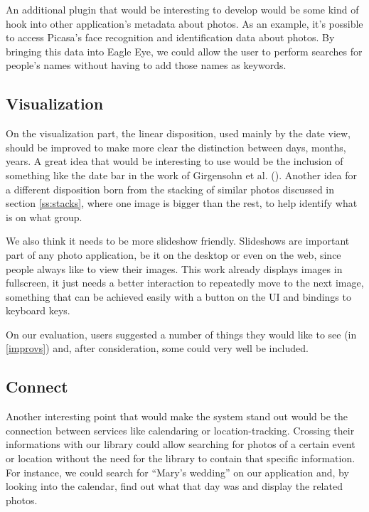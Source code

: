 An additional plugin that would be interesting to develop would be some kind of hook into other application's metadata about photos. As an example, it's possible to access Picasa's face recognition and identification data about photos. By bringing this data into Eagle Eye, we could allow the user to perform searches for people's names without having to add those names as keywords.



\subsection{Visualization} %
\label{sec:visualization}

On the visualization part, the linear disposition, used mainly by the date view, should be improved to make more clear the distinction between days, months, years. A great idea that would be interesting to use would be the inclusion of something like the date bar in the work of Girgensohn et al. \cite{Girgensohn:2010} (). Another idea for a different disposition born from the stacking of similar photos discussed in section \ref{ss:stacks}, where one image is bigger than the rest, to help identify what is on what group.

We also think it needs to be more slideshow friendly. Slideshows are important part of any photo application, be it on the desktop or even on the web, since people always like to view their images. This work already displays images in fullscreen, it just needs a better interaction to repeatedly move to the next image, something that can be achieved easily with a button on the \ac{UI} and bindings to keyboard keys.

On our evaluation, users suggested a number of things they would like to see (in \ref{improvs}) and, after consideration, some could very well be included. 


\subsection{Connect} %
\label{ssub:connect}

Another interesting point that would make the system stand out would be the connection between services like calendaring or location-tracking. Crossing their informations with our library could allow searching for photos of a certain event or location without the need for the library to contain that specific information. For instance, we could search for ``Mary's wedding'' on our application and, by looking into the calendar, find out what that day was and display the related photos.